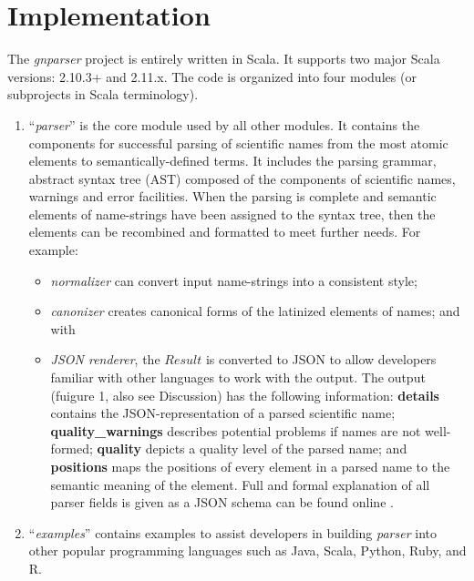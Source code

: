\documentclass{bmcart}
\begin{document}
\section*{Implementation}

The \textit{gnparser} project is entirely written in Scala. It supports two
major Scala versions: 2.10.3+ and 2.11.x. The code is organized into four
modules (or subprojects in Scala terminology).

\begin{enumerate}

  \item ``\textit{parser}'' is the core module used by all other modules. It
    contains the components for successful parsing of scientific names from the most atomic elements to semantically-defined terms. It includes the parsing
    grammar, abstract syntax tree (AST) composed of the components of scientific names, warnings and error facilities.  When the
    parsing is complete and semantic elements of name-strings have been assigned to the
    syntax tree, then the elements can be recombined and formatted to meet further needs.  For
    example:

\begin{itemize}

  \item \textit{normalizer} can convert input name-strings into a consistent style;

  \item \textit{canonizer} creates canonical forms of the latinized elements of names; and with

  \item \textit{JSON renderer}, the $Result$ is converted to JSON
    \cite{bray2014javascript} to allow developers familiar with other languages
    to work with the output.  The output (fuigure 1, also see Discussion) has the following information: \textbf{details} contains the JSON-representation of a parsed scientific name; \textbf{quality\_warnings} describes potential problems if names are not well-formed; \textbf{quality} depicts a quality level of the parsed name;  and \textbf{positions} maps the positions of every element in a parsed name to the semantic meaning of the element. Full and formal explanation of all parser fields is given as a JSON schema
can be found online \cite{gnparser-json}.

\end{itemize}

  \item ``\textit{examples}'' contains  examples to assist developers in
    building \textit{parser} into other popular programming languages such as Java,
    Scala, Python, Ruby, and R.


\end{enumerate}
\end{document}
